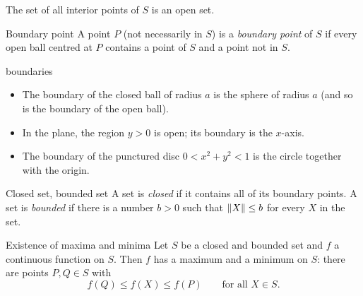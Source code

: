 The set of all interior points of $S$ is an open set.

\begin{definition}{Boundary point}
A point $P$ (not necessarily in $S$) is a \emph{boundary point} of $S$ if every open ball
centred at $P$ contains a point of $S$ and a point not in $S$.
\end{definition}

\begin{center}
\end{center}

\begin{example}{boundaries}
\begin{itemize}
  \item The boundary of the closed ball of radius $a$ is the sphere of radius $a$ (and so is the
  boundary of the open ball).
  \item In the plane, the region $y>0$ is open; its boundary is the $x$-axis.
  \item The boundary of the punctured disc $0<x^2+y^2<1$ is the circle together with the origin.
\end{itemize}
\end{example}

\begin{definition}{Closed set, bounded set}
A set is \emph{closed} if it contains all of its boundary points. A set is \emph{bounded} if
there is a number $b>0$ such that $\left\lVert X\right\rVert\le b$ for every $X$ in the set.
\end{definition}

\begin{theorem}[label=thm:evt]{Existence of maxima and minima}
Let $S$ be a closed and bounded set and $f$ a continuous function on $S$. Then $f$ has a
maximum and a minimum on $S$: there are points $P,Q\in S$ with
\[ f(Q)\le f(X)\le f(P)\qquad\text{for all }X\in S . \]
\end{theorem}

